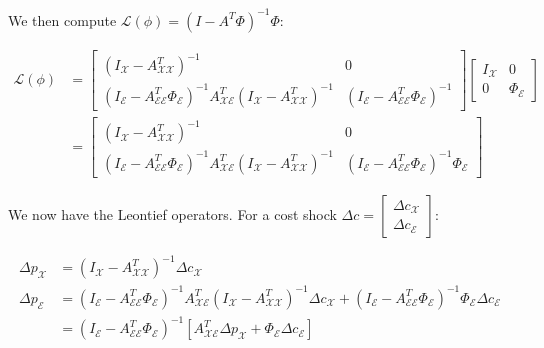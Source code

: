 \documentclass{article}
\begin{document}
\noindent We then compute $\mathcal{L}(\phi) = \left(I - A^T \Phi\right)^{-1} \Phi$: 

\begin{align*}
    \mathcal{L}(\phi) &= \begin{bmatrix}
        \left(I_{\mathcal{X}} - A_{\mathcal{XX}}^T\right)^{-1} & 0 \\
        \left(I_{\mathcal{E}} - A_{\mathcal{EE}}^T \Phi_{\mathcal{E}}\right)^{-1} A_{\mathcal{XE}}^T \left(I_{\mathcal{X}} - A_{\mathcal{XX}}^T\right)^{-1} & \left(I_{\mathcal{E}} - A_{\mathcal{EE}}^T \Phi_{\mathcal{E}}\right)^{-1}
    \end{bmatrix} \begin{bmatrix}
        I_{\mathcal{X}} & 0 \\
        0 & \Phi_{\mathcal{E}}
    \end{bmatrix} \\
    &= \begin{bmatrix}
        \left(I_{\mathcal{X}} - A_{\mathcal{XX}}^T\right)^{-1} & 0 \\
        \left(I_{\mathcal{E}} - A_{\mathcal{EE}}^T \Phi_{\mathcal{E}}\right)^{-1} A_{\mathcal{XE}}^T \left(I_{\mathcal{X}} - A_{\mathcal{XX}}^T\right)^{-1} & \left(I_{\mathcal{E}} - A_{\mathcal{EE}}^T \Phi_{\mathcal{E}}\right)^{-1} \Phi_{\mathcal{E}}
    \end{bmatrix}
\end{align*}

\noindent We now have the Leontief operators. For a cost shock $\Delta c = \begin{bmatrix} \Delta c_{\mathcal{X}} \\ \Delta c_{\mathcal{E}} \end{bmatrix}$:

\begin{align*}
    \Delta p_{\mathcal{X}} &= \left(I_{\mathcal{X}} - A_{\mathcal{XX}}^T\right)^{-1} \Delta c_{\mathcal{X}} \\
    \Delta p_{\mathcal{E}} &= \left(I_{\mathcal{E}} - A_{\mathcal{EE}}^T \Phi_{\mathcal{E}}\right)^{-1} A_{\mathcal{XE}}^T \left(I_{\mathcal{X}} - A_{\mathcal{XX}}^T\right)^{-1} \Delta c_{\mathcal{X}} + \left(I_{\mathcal{E}} - A_{\mathcal{EE}}^T \Phi_{\mathcal{E}}\right)^{-1} \Phi_{\mathcal{E}} \Delta c_{\mathcal{E}} \\
    &= \left(I_{\mathcal{E}} - A_{\mathcal{EE}}^T \Phi_{\mathcal{E}}\right)^{-1} \left[A_{\mathcal{XE}}^T \Delta p_{\mathcal{X}} + \Phi_{\mathcal{E}} \Delta c_{\mathcal{E}}\right]
\end{align*}
\end{document}
